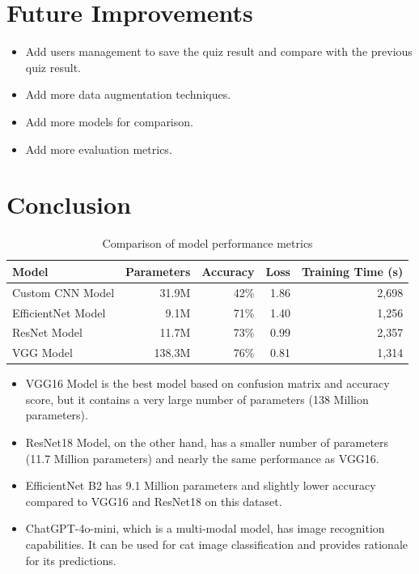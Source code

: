 \documentclass{article}
\begin{document}
\section{Future Improvements}
\begin{itemize}
    \item Add users management to save the quiz result and compare with the previous quiz result.
    \item Add more data augmentation techniques.
    \item Add more models for comparison.
    \item Add more evaluation metrics.
\end{itemize}

\section{Conclusion}
\begin{table}[H]
    \centering
    \begin{tabular}{lrrrr}
    \toprule
    \textbf{Model} & \textbf{Parameters} & \textbf{Accuracy} & \textbf{Loss} & \textbf{Training Time (s)} \\
    \midrule
    Custom CNN Model & 31.9M & 42\% & 1.86 & 2,698 \\
    EfficientNet Model & 9.1M & 71\% & 1.40 & 1,256 \\
    ResNet Model & 11.7M & 73\% & 0.99 & 2,357 \\
    VGG Model & 138.3M & 76\% & 0.81 & 1,314 \\
    \bottomrule
    \end{tabular}
    \caption{Comparison of model performance metrics}
    \label{tab:model_comparison}
\end{table}

\begin{itemize}
    \item VGG16 Model is the best model based on confusion matrix and accuracy score, but it contains a very large number of parameters (138 Million parameters).
    \item ResNet18 Model, on the other hand, has a smaller number of parameters (11.7 Million parameters) and nearly the same performance as VGG16.
    \item EfficientNet B2 has 9.1 Million parameters and slightly lower accuracy compared to VGG16 and ResNet18 on this dataset.
    \item ChatGPT-4o-mini, which is a multi-modal model, has image recognition capabilities. It can be used for cat image classification and provides rationale for its predictions.
\end{itemize}
\end{document}
